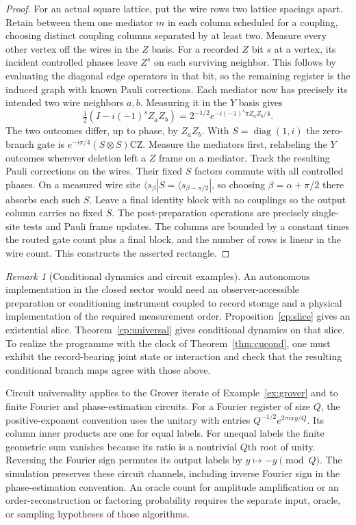 \documentclass[aps,pra,onecolumn,superscriptaddress,nofootinbib,10pt]{revtex4-2}
\theoremstyle{definition}
\theoremstyle{remark}
\newtheorem{remark}[theorem]{Remark}
\begin{document}
\begin{proof}
For an actual square lattice, put the wire rows two lattice spacings apart. Retain between them one mediator $m$ in each column scheduled for a coupling, choosing distinct coupling columns separated by at least two. Measure every other vertex off the wires in the $Z$ basis. For a recorded $Z$ bit $s$ at a vertex, its incident controlled phases leave $Z^s$ on each surviving neighbor. This follows by evaluating the diagonal edge operators in that bit, so the remaining register is the induced graph with known Pauli corrections. Each mediator now has precisely its intended two wire neighbors $a,b$.
Measuring it in the $Y$ basis gives
\[
 \tfrac12(I-i(-1)^s Z_a Z_b)
 =2^{-1/2}e^{-i(-1)^s\pi Z_a Z_b/4}.
\]
The two outcomes differ, up to phase, by $Z_aZ_b$. With $S=\operatorname{diag}(1,i)$ the zero-branch gate is $e^{-i\pi/4}(S\otimes S)\mathrm{CZ}$. Measure the mediators first, relabeling the $Y$ outcomes wherever deletion left a $Z$ frame on a mediator. Track the resulting Pauli corrections on the wires. Their fixed $S$ factors commute with all controlled phases. On a measured wire site $\langle s_\beta|S=\langle s_{\beta-\pi/2}|$, so choosing $\beta=\alpha+\pi/2$ there absorbs each such $S$. Leave a final identity block with no couplings so the output column carries no fixed $S$. The post-preparation operations are precisely single-site tests and Pauli frame updates. The columns are bounded by a constant times the routed gate count plus a final block, and the number of rows is linear in the wire count. This constructs the asserted rectangle.
\end{proof}

\begin{remark}[Conditional dynamics and circuit examples]\label{cp:compprogramme}
An autonomous implementation in the closed sector would need an observer-accessible preparation or conditioning instrument coupled to record storage and a physical implementation of the required measurement order. Proposition~\ref{cp:slice} gives an existential slice. Theorem~\ref{cp:universal} gives conditional dynamics on that slice. To realize the programme with the clock of Theorem~\ref{thm:cucond}, one must exhibit the record-bearing joint state or interaction and check that the resulting conditional branch maps agree with those above.

Circuit universality applies to the Grover iterate of Example~\ref{ex:grover} and to finite Fourier and phase-estimation circuits. For a Fourier register of size $Q$, the positive-exponent convention uses the unitary with entries $Q^{-1/2}e^{2\pi i xy/Q}$. Its column inner products are one for equal labels. For unequal labels the finite geometric sum vanishes because its ratio is a nontrivial $Q$th root of unity. Reversing the Fourier sign permutes its output labels by $y\mapsto-y\pmod Q$. The simulation preserves these circuit channels, including inverse Fourier sign in the phase-estimation convention. An oracle count for amplitude amplification or an order-reconstruction or factoring probability requires the separate input, oracle, or sampling hypotheses of those algorithms. \cite{n5-qft,n5-shor}
\end{remark}
\end{document}
